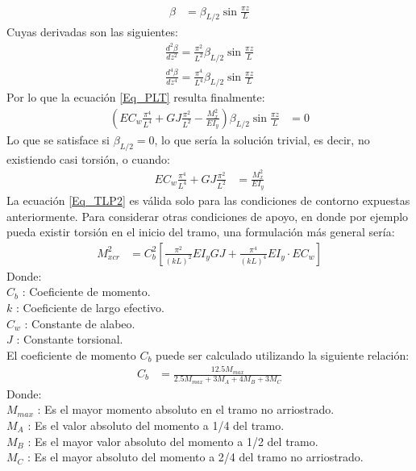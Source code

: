 \begin{align}
    \beta &= \beta_{L/2}\sin{\frac{\pi z}{L}}
\end{align}
Cuyas derivadas son las siguientes:
\begin{align}
    \frac{d^2\beta}{dz^2} = \frac{\pi^2}{L^2}\beta_{L/2}\sin{\frac{\pi z}{L}}\\
    \frac{d^4\beta}{dz^4} = \frac{\pi^4}{L^4}\beta_{L/2}\sin{\frac{\pi z}{L}}
\end{align}
Por lo que la ecuación \ref{Eq_PLT} resulta finalmente:
\begin{align}
    \left(EC_w\frac{\pi^4}{L^4}+ GJ\frac{\pi^2}{L^2} - \frac{M_x^2}{EI_y}\right)\beta_{L/2}\sin{\frac{\pi z}{L}} &= 0
\end{align}
Lo que se satisface si $\beta_{L/2}=0$, lo que sería la solución trivial, es decir, no existiendo casi torsión, o cuando:
\begin{align}
\label{Eq_TLP2}
      EC_w\frac{\pi^4}{L^4}+ GJ\frac{\pi^2}{L^2} &= \frac{M_x^2}{EI_y}   
\end{align}
La ecuación \ref{Eq_TLP2} es válida solo para las condiciones de contorno expuestas anteriormente. Para considerar otras condiciones de apoyo, en donde por ejemplo pueda existir torsión en el inicio del tramo, una formulación más general sería:
\begin{align}
\label{Eq_TLP3}
    M_{xcr}^2 &= C_b^2\left[\frac{\pi^2}{(kL)^2}EI_yGJ + \frac{\pi^4}{(kL)^4}EI_y\cdot EC_w\right]
\end{align}
Donde:\\
$C_b$ : Coeficiente de momento.\\
$k$ : Coeficiente de largo efectivo.\\
$C_w$ : Constante de alabeo.\\
$J$ : Constante torsional.\\
El coeficiente de momento $C_b$ puede ser calculado utilizando la siguiente relación:
\begin{align}
    C_b &= \frac{12.5M_{max}}{2.5M_{max}+3M_A+4M_B+3M_C}
\end{align}
Donde:\\
$M_{max}$ : Es el mayor momento absoluto en el tramo no arriostrado.\\
\hspace{10mm}$M_A$ : Es el valor absoluto del momento a 1/4 del tramo.\\
\hspace{10mm}$M_B$ : Es el mayor valor absoluto del momento a 1/2 del tramo.\\
\hspace{10mm}$M_C$ : Es el mayor absoluto del momento a 2/4 del tramo no arriostrado.\\

